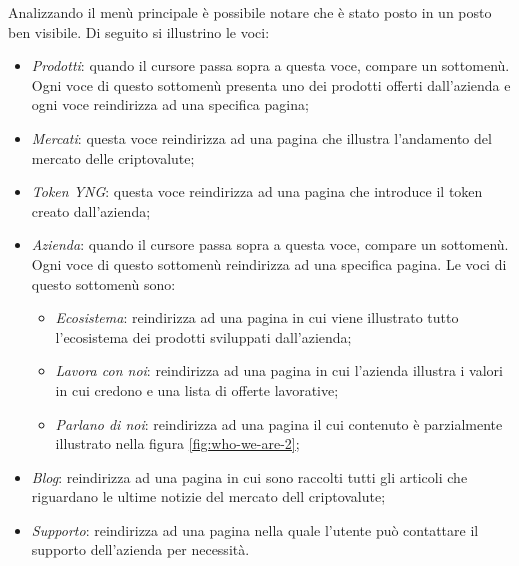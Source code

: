 Analizzando il menù principale è possibile notare che è stato posto in un 
posto ben visibile. Di seguito si illustrino le voci:
\begin{itemize}
  \item \textit{Prodotti}: quando il cursore passa sopra a questa voce, 
  compare un sottomenù. Ogni voce di questo sottomenù presenta uno dei 
  prodotti offerti dall'azienda e ogni voce reindirizza ad una specifica 
  pagina;

  \item \textit{Mercati}: questa voce reindirizza ad una pagina che 
  illustra l'andamento del mercato delle criptovalute;
  
  \item \textit{Token YNG}: questa voce reindirizza ad una pagina che 
  introduce il token creato dall'azienda;

  \item \textit{Azienda}: quando il cursore passa sopra a questa voce, 
  compare un sottomenù. Ogni voce di questo sottomenù reindirizza ad una 
  specifica pagina. Le voci di questo sottomenù sono:
  \begin{itemize}
    \item \textit{Ecosistema}: reindirizza ad una pagina in cui viene 
    illustrato tutto l'ecosistema dei prodotti sviluppati dall'azienda;
    \item \textit{Lavora con noi}: reindirizza ad una pagina in cui 
    l'azienda illustra i valori in cui credono e una lista di offerte 
    lavorative;
    \item \textit{Parlano di noi}: reindirizza ad una pagina il cui 
    contenuto è parzialmente illustrato nella figura \ref{fig:who-we-are-2};
  \end{itemize}

  \item \textit{Blog}: reindirizza ad una pagina in cui sono raccolti 
  tutti gli articoli che riguardano le ultime notizie del mercato dell 
  criptovalute;

  \item \textit{Supporto}: reindirizza ad una pagina nella quale l'utente 
  può contattare il supporto dell'azienda per necessità.
\end{itemize}


